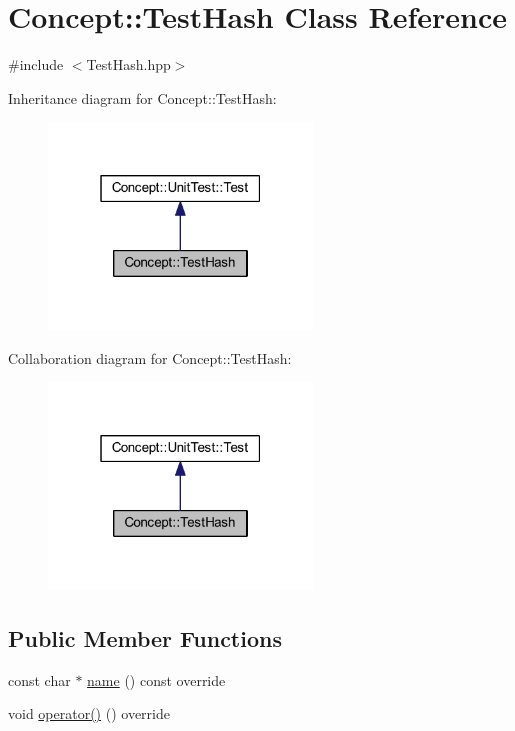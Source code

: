 \hypertarget{class_concept_1_1_test_hash}{}\section{Concept\+::Test\+Hash Class Reference}
\label{class_concept_1_1_test_hash}


{\ttfamily \#include $<$Test\+Hash.\+hpp$>$}



Inheritance diagram for Concept\+::Test\+Hash\+:\nopagebreak
\begin{figure}[H]
\begin{center}
\leavevmode
\includegraphics[width=199pt]{class_concept_1_1_test_hash__inherit__graph}
\end{center}
\end{figure}


Collaboration diagram for Concept\+::Test\+Hash\+:\nopagebreak
\begin{figure}[H]
\begin{center}
\leavevmode
\includegraphics[width=199pt]{class_concept_1_1_test_hash__coll__graph}
\end{center}
\end{figure}
\subsection*{Public Member Functions}
\begin{DoxyCompactItemize}
\item 
const char $\ast$ \mbox{\hyperlink{class_concept_1_1_test_hash_a5bfa2f26b227562240a70d23f1df2018}{name}} () const override
\item 
void \mbox{\hyperlink{class_concept_1_1_test_hash_aaa06219ede091614bb050ede4f8676f0}{operator()}} () override
\end{DoxyCompactItemize}
